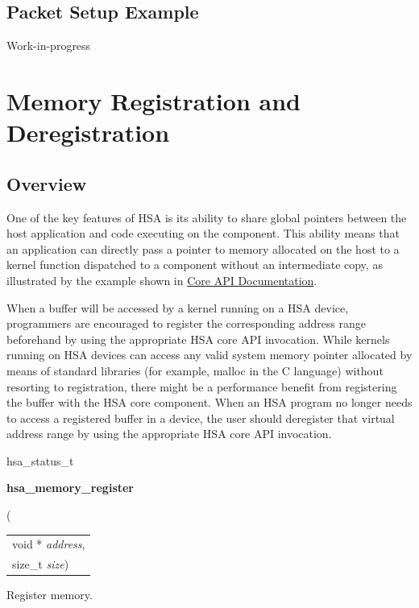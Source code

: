 \documentclass{book}
\newcommand{\hsaarg}[1]{\textit{#1}}
\newcommand{\hsadef}[2]{\hypertarget{#1}{\textbf{#2}}}
\newcommand{\hsatyp}[2]{\hypertarget{#1}{#2}}
\begin{document}
\hypertarget{aql_example}{}\subsection{Packet Setup
Example}\label{aql_example}
{\color{red} Work-in-progress}


\hypertarget{coreapi_memory_registration}{}\section{Memory Registration and Deregistration}\label{coreapi_memory_registration}
\hypertarget{coreapi_registration_overview}{}\subsection{Overview}\label{coreapi_registration_overview}
One of the key features of HSA is its ability to share global
pointers between the host application and code executing on the
component. This ability means that an application can directly pass a
pointer to memory allocated on the host to a kernel function
dispatched to a component without an intermediate copy, as illustrated
by the example shown in \hyperlink{coreapi}{Core API
Documentation}.

When a buffer will be accessed by a kernel running on a HSA
device, programmers are encouraged to register the corresponding
address range beforehand by using the appropriate HSA core
API invocation. While kernels running on HSA devices can
access any valid system memory pointer allocated by means of
standard libraries (for example, malloc in the C language) without
resorting to registration, there might be a performance benefit from
registering the buffer with the HSA core component. When an
HSA program no longer needs to access a registered buffer in a
device, the user should deregister that virtual address range by
using the appropriate HSA core API invocation.

\makeatletter{}

\noindent\begin{tcolorbox}[nobeforeafter,colframe=white,colback=lightgray,left=0mm]
\hsatyp{group__ENU__status_1gad755322e7ff95456520e8abdbe90d225}{hsa\_status\_t} \hsadef{group__API__register_1ga13131274af7b6c583b689eaaca3e21f0}{hsa\_memory\_register}(\\
\begin{tabular}{@{}l}
\hspace{1.7em}void * \hsaarg{address},\\
\hspace{1.7em}size\_t \hsaarg{size})\end{tabular}

\end{tcolorbox}
Register memory.
\end{document}
